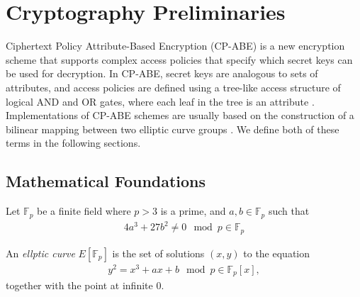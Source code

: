 \documentclass{sig-alternate}
\newenvironment{definition}[1][Definition]{\begin{trivlist}
\item[\hskip \labelsep {\bfseries #1}]}{\end{trivlist}}
\begin{document}





\section{Cryptography Preliminaries}
Ciphertext Policy Attribute-Based Encryption (CP-ABE) is a new encryption scheme that supports complex
access policies that specify which secret keys can be used for decryption. In CP-ABE, secret keys are analogous
to sets of attributes, and access policies are defined using a tree-like access structure of logical AND and OR
gates, where each leaf in the tree is an attribute \cite{Bethencourt2007-CPABE}. Implementations of 
CP-ABE schemes are usually based on the construction of a bilinear mapping between two elliptic curve 
groups \cite{Bethencourt2007-CPABE} \cite{Junod2010-ABE}. We define both of these terms in the following sections.

\subsection{Mathematical Foundations}
\begin{definition}
Let $\mathbb{F}_p$ be a finite field where $p > 3$ is a prime, and $a, b \in \mathbb{F}_p$ such that
\begin{align*}
4a^3 + 27b^2 \not= 0 \mod p \in \mathbb{F}_p
\end{align*}

An \emph{ellptic curve} $E[\mathbb{F}_p]$ is the set of solutions $(x, y)$ to the equation
\begin{align*}
y^2 = x^3 + ax + b \mod p \in \mathbb{F}_p[x],
\end{align*}
together with the point at infinite $0$.
\end{definition}
\end{document}
